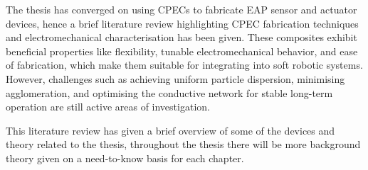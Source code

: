 The thesis has converged on using CPECs to fabricate EAP sensor and actuator devices, hence a brief literature review highlighting CPEC fabrication techniques and electromechanical characterisation has been given. These composites exhibit beneficial properties like flexibility, tunable electromechanical behavior, and ease of fabrication, which make them suitable for integrating into soft robotic systems. However, challenges such as achieving uniform particle dispersion, minimising agglomeration, and optimising the conductive network for stable long-term operation are still active areas of investigation.

This literature review has given a brief overview of some of the devices and theory related to the thesis, throughout the thesis there will be more background theory given on a need-to-know basis for each chapter.




\cleardoublepage